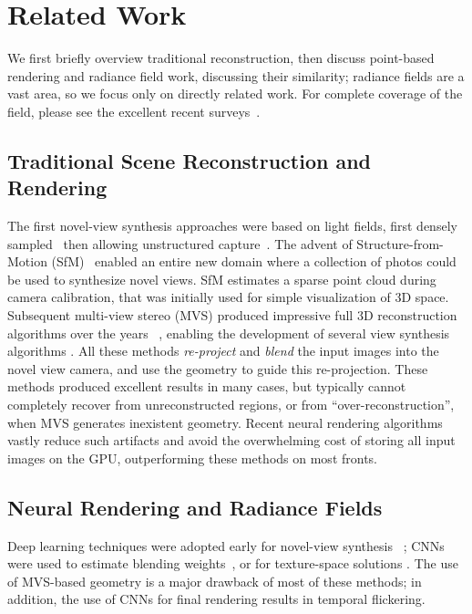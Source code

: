 \section{Related Work}

We first briefly overview traditional reconstruction, then discuss point-based rendering and radiance field work, discussing their similarity; radiance fields are a vast area, so we focus only on directly related work. 
For complete coverage of the field, please see the excellent recent surveys~\cite{tewari2022advances,xie2022neural}.


\subsection{Traditional Scene Reconstruction and Rendering}

The first novel-view synthesis approaches were based on light fields, first densely sampled~\cite{gortler1996lumigraph,levoy1996light} then allowing unstructured capture~\cite{buehler2001unstructured}. The advent of Structure-from-Motion (SfM)~\cite{snavely2006photo} enabled an entire new domain where a collection of photos could be used to synthesize novel views. SfM estimates a sparse point cloud during camera calibration, that was initially used for simple visualization of 3D space. Subsequent multi-view stereo (MVS) produced impressive full 3D reconstruction algorithms over the years ~\cite{goesele2007multi}, enabling the development of several view synthesis algorithms \cite{eisemann2008floating, chaurasia2013depth, hedman2018deep,kopanas21}.
All these methods \emph{re-project} and \emph{blend} the input images into the novel view camera, and use the geometry to guide this re-projection. These methods produced excellent results in many cases, but typically cannot completely recover from unreconstructed regions, or from ``over-reconstruction'', when MVS generates inexistent geometry.
Recent neural rendering algorithms ~\cite{tewari2022advances} vastly reduce such artifacts and avoid the overwhelming cost of storing all input images on the GPU, outperforming these methods on most fronts.

\subsection{Neural Rendering and Radiance Fields}

Deep learning techniques were adopted early for novel-view synthesis ~\cite{zhou2016view, flynn2016deepstereo}; CNNs were used to estimate blending weights~\cite{hedman2018deep}, or for texture-space solutions \cite{thies2019deferred,riegler2020free}. The use of MVS-based geometry is a major drawback of most of these methods; in addition, the use of CNNs for final rendering  results in  temporal flickering.

